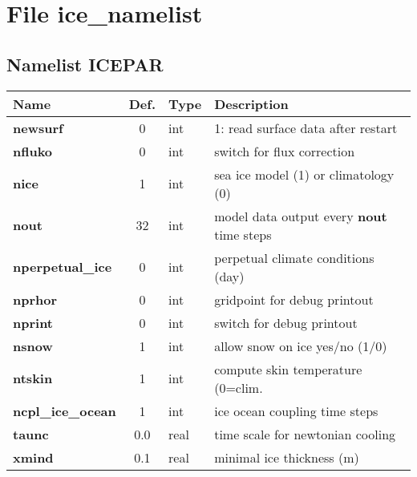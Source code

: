 \section{File ice\_namelist}
\subsection{Namelist ICEPAR}
\begin{tabular}{|l|c|l|l|}                                  
\hline                                                        
Name   & Def. & Type & Description \\               
\hline                                                        
{\bf newsurf}& 0 & int & 1: read surface data after restart \\
{\bf nfluko}&  0 & int & switch for flux correction \\
{\bf nice  }& 1 & int & sea ice model (1) or climatology (0) \\
{\bf nout  }& 32 & int & model data output every {\bf nout} time steps \\
{\bf nperpetual\_ice}& 0 & int & perpetual climate conditions (day) \\
{\bf nprhor}& 0 & int & gridpoint for debug printout \\
{\bf nprint}& 0 & int & switch for debug printout \\
{\bf nsnow}& 1 & int & allow snow on ice yes/no (1/0) \\
{\bf ntskin}& 1 & int & compute skin temperature (0=clim. \\
{\bf ncpl\_ice\_ocean  }& 1 & int & ice ocean coupling time steps \\
{\bf taunc}& 0.0 & real & time scale for newtonian cooling \\
{\bf xmind}& 0.1 & real & minimal ice thickness (m) \\
\hline                                                        
\end{tabular}


